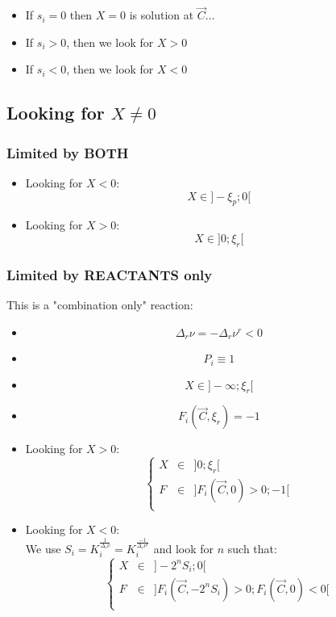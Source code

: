 \documentclass[aps,12pt]{revtex4}
\begin{document}
\begin{itemize}
\item If $s_i=0$ then $X=0$ is solution at $\vec{C}$...

\item If $s_i>0$, then we look for $X>0$

\item If $s_i<0$, then we look for $X<0$

\end{itemize}

\subsection{Looking for $X\not=0$}
	
\subsubsection{Limited by BOTH}

\begin{itemize}
\item Looking for $X<0$:
$$
X \in \rbrack -\xi_p; 0 \lbrack
$$
\item Looking for $X>0$:
$$
X \in \rbrack 0; \xi_r \lbrack
$$
\end{itemize}

\subsubsection{Limited by REACTANTS only}
This is a "combination only" reaction:
\begin{itemize}
\item
$$
	\Delta_r \nu = - \Delta_r \nu^r < 0 
$$
\item $$P_i \equiv 1$$
\item $$X \in \rbrack -\infty; \xi_r \lbrack$$
\item $$F_i(\vec{C},\xi_r)=-1$$
\item Looking for $X>0$:
 $$
 \left\lbrace
 \begin{array}{rcl}
 	X &\in& \rbrack 0;\xi_r \lbrack\\
	F &\in& \rbrack F_i(\vec{C},0)>0 ; -1 \lbrack\\
\end{array}
\right.
 $$
 \item Looking for $X<0$:\\
 We use $S_i=K_i^{\frac{1}{\Delta_r \nu}}=K_i^{\frac{-1}{\Delta_r \nu^r}}$
 and look for $n$ such that:
 $$
 	\left\lbrace
 \begin{array}{rcl}
 	X &\in& \rbrack -2^n S_i;0 \lbrack\\
	F &\in& \rbrack F_i(\vec{C},-2^nS_i)>0 ; F_i(\vec{C},0)<0 \lbrack\\
\end{array}
\right.
 $$
\end{itemize}
 	
\end{document}
